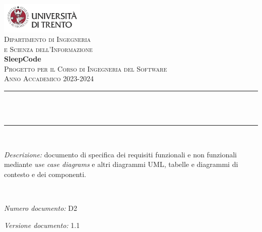 \begin{titlepage}
\newcommand{\HRule}{\rule{\linewidth}{0.3mm}} %
\center %

\includegraphics[width=0.3\textwidth]{materiale/elementi-copertina/UniTrento_logo_ITA_colore.png}\\[0.5cm]
\textsc{\Large Dipartimento di Ingegneria\\e Scienza dell'Informazione}\\[1.5cm]

{\Huge\textbf{SleepCode}}\\[0.5cm]
\textsc{\large Progetto per il Corso di Ingegneria del Software}\\
\textsc{\large Anno Accademico 2023-2024}\\[0.5cm]


\HRule\\[0.4cm]
{\huge\bfseries \@title}\\[0.1cm]
\HRule\\[1cm]

\begin{minipage}{\textwidth}
\textit{Descrizione:} documento di specifica dei requisiti funzionali e non funzionali mediante \textit{use case diagrams} e altri diagrammi UML, tabelle e diagrammi di contesto e dei componenti.
\end{minipage}\\[1.5cm]


\begin{minipage}{0.4\textwidth}
\begin{flushleft}
\large
\textit{Numero documento:} D2
\end{flushleft}
\end{minipage}
\begin{minipage}{0.4\textwidth}
\begin{flushright}
\large
\textit{Versione documento:} 1.1
\end{flushright}
\end{minipage}\\[1.5cm]


\end{titlepage}
